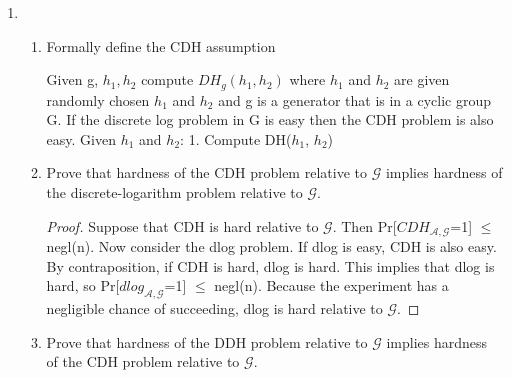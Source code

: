 \documentclass{article}
\begin{document}
\begin{enumerate}
\begin{enumerate}
        \begin{proof}
          Let $p, q \in \mathbb{Z}$ such that $p, q$ are distinct primes. $N =
          pq$. Let $e, d \in \mathbb{Z}$ such that $ed \equiv 1 \pmod{\phi(N)}$.
          Consider $\phi(N)$.

          Since $N$ is composite, $\phi(N) = (p - 1)(q - 1)$.

          Since $ed \equiv 1 \pmod{\phi(N)}$, $ed \equiv \pmod{(p - 1)(q - 1)}$,
          so $ed \equiv 1 + (p - 1)(q - 1)k$, for some $k \in \mathbb{Z}$.

          Now consider, $x^{ed}$. $x^{ed} = x^{(p - 1)(q - 1) + 1} = x^{(p -
            1)}x^{(q - 1)}x$

          Now, since $p - 1$ and $q - 1$ are inverses ($\mod (p - 1)(q - 1)$),
          $x^{p - 1}x^{q - 1}x = 1 * 1 * x = x$.

          So, $x^{ed} = x$.
         \end{proof}
    \end{enumerate}
  \item 
    \begin{enumerate}
      \item Formally define the CDH assumption

      Given g, $h_1, h_2$ compute $DH_g(h_1, h_2)$ where $h_1$ and $h_2$ are given randomly chosen $h_1$ and $h_2$ and g is a generator that is in a cyclic group G. 
      If the discrete log problem in G is easy then the CDH problem is also easy. 
      Given $h_1$ and $h_2$:
      1. Compute DH($h_1$, $h_2$)
      
      \item Prove that hardness of the CDH problem relative to $\mathcal{G}$ implies
        hardness of the discrete-logarithm problem relative to $\mathcal{G}$.

        \begin{proof}
            Suppose that CDH is hard relative to $\mathcal{G}$. Then Pr[$CDH_{\mathcal{A}, \mathcal{G}}$=1] $\leq$ negl(n). Now consider the dlog problem. If dlog is easy, CDH is also easy. By contraposition, if CDH is hard, dlog is hard. This implies that dlog is hard, so Pr[$dlog_{\mathcal{A}, \mathcal{G}}$=1] $\leq$ negl(n). Because the experiment has a negligible chance of succeeding, dlog is hard relative to $\mathcal{G}$.
        \end{proof}
        
      \item Prove that hardness of the DDH problem relative to $\mathcal{G}$
        implies hardness of the CDH problem relative to $\mathcal{G}$.


\end{enumerate}
\end{enumerate}
\end{document}
